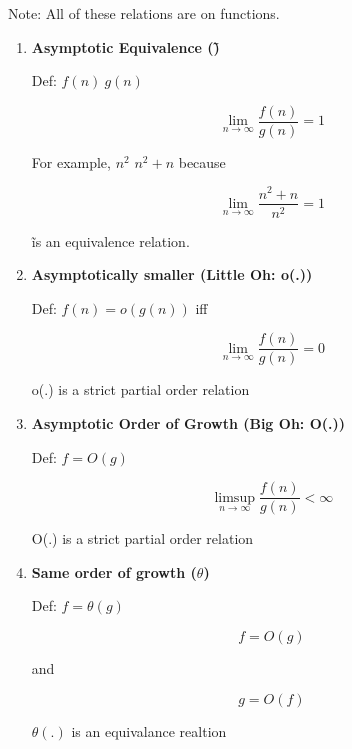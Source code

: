 \documentclass{article}
\begin{document}
Note: All of these relations are on functions.

\begin{enumerate}
    \item \textbf{Asymptotic Equivalence (\~)}

        Def: $f(n) ~ g(n)$

        $$
            \lim_{n \rightarrow \infty} \frac{f(n)}{g(n)} = 1
        $$

        For example, $n^2$ $n^2 + n$ because

        $$
            \lim_{n \rightarrow \infty} \frac{n^2 + n}{n^2} = 1
        $$

        \~ is an equivalence relation.

    \item \textbf{Asymptotically smaller (Little Oh: o(.))}

        Def: $f(n) = o(g(n))$ iff

        $$
            \lim_{n \rightarrow \infty} \frac{f(n)}{g(n)} = 0
        $$

        o(.) is a strict partial order relation

    \item \textbf{Asymptotic Order of Growth (Big Oh: O(.))}

        Def: $f = O(g)$

        $$
            \limsup_{n \rightarrow \infty} \frac{f(n)}{g(n)} < \infty
        $$

        O(.) is a strict partial order relation

    \item \textbf{Same order of growth ($\theta$)}

        Def: $f = \theta(g)$  

        $$ 
        f = O(g) 
        $$ 
 
        and 
 
        $$ 
        g = O(f) 
        $$ 
  
        $\theta(.)$ is an equivalance realtion

\end{enumerate}
\end{document}
